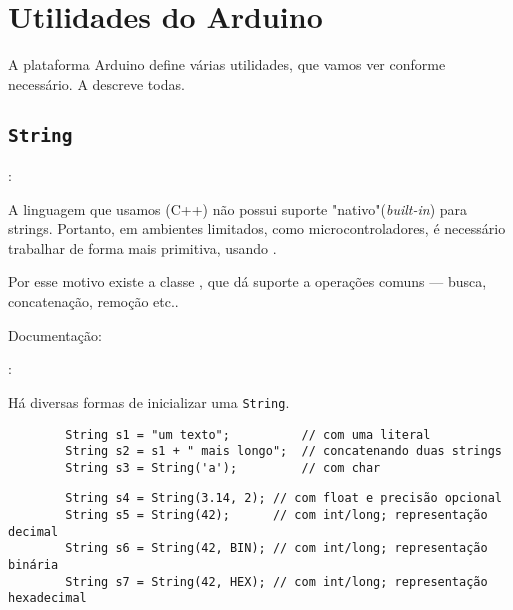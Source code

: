 
\section{Utilidades do Arduino}


\begin{frame}{\insertsection}

	A plataforma Arduino define várias utilidades, que vamos ver conforme necessário. A  descreve todas.

\end{frame}


\subsection{\texttt{String}}


\begin{frame}[b]{\insertsection: \insertsubsection}

	A linguagem que usamos (C++) não possui suporte "nativo"\@ (\textit{built-in}) para strings. Portanto, em ambientes limitados, como microcontroladores, é necessário trabalhar de forma mais primitiva, usando .

	\medskip
	Por esse motivo existe a classe , que dá suporte a operações comuns --- busca, concatenação, remoção etc..

	\vfill
	Documentação: 

\end{frame}


\begin{frame}[fragile]{\insertsection: \insertsubsection}

	Há diversas formas de inicializar uma \texttt{String}.

	\begin{verbatim}
		String s1 = "um texto";          // com uma literal
		String s2 = s1 + " mais longo";  // concatenando duas strings
		String s3 = String('a');         // com char
	\end{verbatim}

	\begin{verbatim}
		String s4 = String(3.14, 2); // com float e precisão opcional
		String s5 = String(42);      // com int/long; representação decimal
		String s6 = String(42, BIN); // com int/long; representação binária
		String s7 = String(42, HEX); // com int/long; representação hexadecimal
	\end{verbatim}

\end{frame}


